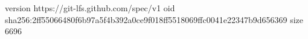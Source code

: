 version https://git-lfs.github.com/spec/v1
oid sha256:2ff55066480f6b97a5f4b392a0ce9f018ff5518069ffc0041e22347b9d656369
size 6696
